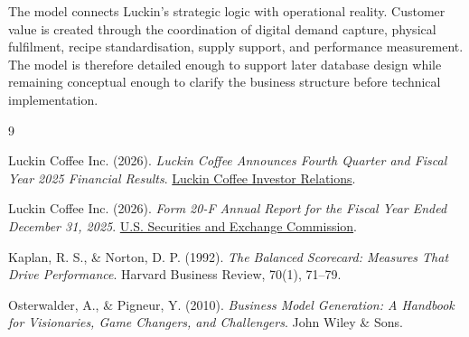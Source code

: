 \documentclass[12pt,a4paper]{article}
\begin{document}
The model connects Luckin's strategic logic with operational reality. Customer value is created through the coordination of digital demand capture, physical fulfilment, recipe standardisation, supply support, and performance measurement. The model is therefore detailed enough to support later database design while remaining conceptual enough to clarify the business structure before technical implementation.

\begingroup
\small
\setlength{\itemsep}{0pt}
\begin{thebibliography}{9}

Luckin Coffee Inc. (2026).
\emph{Luckin Coffee Announces Fourth Quarter and Fiscal Year 2025 Financial Results}.
\href{https://investor.luckincoffee.com/news-releases/news-release-details/luckin-coffee-announces-fourth-quarter-and-fiscal-year-2025/}{Luckin Coffee Investor Relations}.

Luckin Coffee Inc. (2026).
\emph{Form 20-F Annual Report for the Fiscal Year Ended December 31, 2025}.
\href{https://www.sec.gov/Archives/edgar/data/1767582/000110465926035712/lk-20251231x20f.htm}{U.S. Securities and Exchange Commission}.

Kaplan, R. S., \& Norton, D. P. (1992).
\emph{The Balanced Scorecard: Measures That Drive Performance}.
Harvard Business Review, 70(1), 71--79.

Osterwalder, A., \& Pigneur, Y. (2010).
\emph{Business Model Generation: A Handbook for Visionaries, Game Changers, and Challengers}.
John Wiley \& Sons.

\end{thebibliography}
\endgroup
\end{document}
